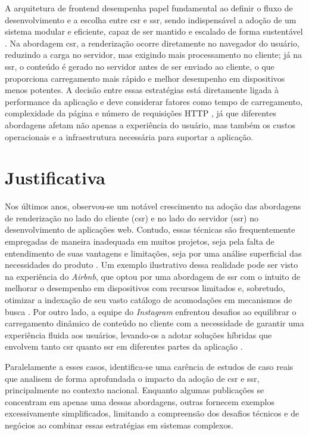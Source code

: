 A arquitetura de frontend desempenha papel fundamental ao definir o fluxo de desenvolvimento e a escolha entre \acrshort{csr} e \acrshort{ssr}, sendo indispensável a adoção de um sistema modular e eficiente, capaz de ser mantido e escalado de forma sustentável \cite{frontendGodbolt}. Na abordagem \acrshort{csr}, a renderização ocorre diretamente no navegador do usuário, reduzindo a carga no servidor, mas exigindo mais processamento no cliente; já na \acrshort{ssr}, o conteúdo é gerado no servidor antes de ser enviado ao cliente, o que proporciona carregamento mais rápido e melhor desempenho em dispositivos menos potentes. A decisão entre essas estratégias está diretamente ligada à performance da aplicação e deve considerar fatores como tempo de carregamento, complexidade da página e número de requisições HTTP \cite{webPerformance}, já que diferentes abordagens afetam não apenas a experiência do usuário, mas também os custos operacionais e a infraestrutura necessária para suportar a aplicação.

\section{Justificativa}

Nos últimos anos, observou-se um notável crescimento na adoção das abordagens de renderização no lado do cliente (\acrshort{csr}) e no lado do servidor (\acrshort{ssr}) no desenvolvimento de aplicações web. Contudo, essas técnicas são frequentemente empregadas de maneira inadequada em muitos projetos, seja pela falta de entendimento de suas vantagens e limitações, seja por uma análise superficial das necessidades do produto \cite{atori2024}. Um exemplo ilustrativo dessa realidade pode ser visto na experiência do \emph{Airbnb}, que optou por uma abordagem de \acrshort{ssr} com o intuito de melhorar o desempenho em dispositivos com recursos limitados e, sobretudo, otimizar a indexação de seu vasto catálogo de acomodações em mecanismos de busca \cite{neary2017}. Por outro lado, a equipe do \emph{Instagram} enfrentou desafios ao equilibrar o carregamento dinâmico de conteúdo no cliente com a necessidade de garantir uma experiência fluida aos usuários, levando-os a adotar soluções híbridas que envolvem tanto \acrshort{csr} quanto \acrshort{ssr} em diferentes partes da aplicação \cite{conner2019}.

Paralelamente a esses casos, identifica-se uma carência de estudos de caso reais que analisem de forma aprofundada o impacto da adoção de \acrshort{csr} e \acrshort{ssr}, principalmente no contexto nacional. Enquanto algumas publicações se concentram em apenas uma dessas abordagens, outras fornecem exemplos excessivamente simplificados, limitando a compreensão dos desafios técnicos e de negócios ao combinar essas estratégias em sistemas complexos.

